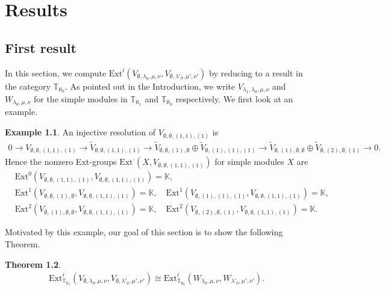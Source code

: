 \documentclass[openany, a4paper]{amsbook}
\newtheorem{thm}{Theorem}[chapter]
\theoremstyle{definition}
\newtheorem{exmp}[thm]{Example}
\numberwithin{equation}{chapter}
\newcommand{\T}[1]{{\mathbb{T}}_{\aleph_{#1}}}
\newcommand{\Ext}[4]{\mathrm{Ext}^{#1}_{#2}({#3}, {#4})}
\begin{document}
\chapter{Results}
\section{First result}

In this section, we compute $\Ext{i}{}{V_{\emptyset, \lambda_0, \mu, \nu}}{V_{\emptyset, \lambda'_0, \mu', \nu'}}$ by reducing to a result in the category $\T{0}$. As pointed out in the Introduction, we write $V_{\lambda_1, \lambda_0, \mu, \nu}$ and $W_{\lambda_0, \mu, \nu}$ for the simple modules in $\T{1}$ and $\T{0}$ respectively. We first look at an example.

\begin{exmp}
    An injective resolution of $V_{\emptyset, \emptyset, (1,1), (1)}$ is
    \begin{align*}
        0 \to V_{\emptyset, \emptyset, (1,1), (1)} \to \tilde{V}_{\emptyset, \emptyset, (1,1), (1)} \to \tilde{V}_{\emptyset, \emptyset, (1), \emptyset} \oplus\tilde{V}_{\emptyset, (1), (1), (1)} \to \tilde{V}_{\emptyset, (1),  \emptyset, \emptyset} \oplus\tilde{V}_{\emptyset, (2),  \emptyset, (1)} \to 0.
    \end{align*}
    Hence the nonzero Ext-groups $\Ext{\cdot}{}{X}{V_{\emptyset, \emptyset, (1,1), (1)}}$ for simple modules $X$ are
    \begin{align*}
        &\Ext{0}{}{V_{\emptyset, \emptyset, (1,1), (1)}}{V_{\emptyset, \emptyset, (1,1), (1)}} = \mathbb{K}, \\
        &\Ext{1}{}{V_{\emptyset, \emptyset, (1), \emptyset}}{V_{\emptyset, \emptyset, (1,1), (1)}} = \mathbb{K}, \quad  \Ext{1}{}{V_{\emptyset, (1), (1), (1)}}{V_{\emptyset, \emptyset, (1,1), (1)}} = \mathbb{K},\\
        &\Ext{2}{}{V_{\emptyset, (1),  \emptyset, \emptyset}}{V_{\emptyset, \emptyset, (1,1), (1)}} = \mathbb{K}, \quad \Ext{2}{}{V_{\emptyset, (2),  \emptyset, (1)}}{V_{\emptyset, \emptyset, (1,1), (1)}} = \mathbb{K}.
    \end{align*}
\end{exmp}

Motivated by this example, our goal of this section is to show the following Theorem. 
\begin{thm}\label{result1}
    \begin{align}
        \Ext{i}{\T{1}}{V_{\emptyset, \lambda_0, \mu, \nu}}{V_{\emptyset, \lambda'_0, \mu', \nu'}} \cong 
        \Ext{i}{\T{0}}{W_{\lambda_0, \mu, \nu}}{W_{\lambda'_0, \mu', \nu'}}.
        \end{align}        
\end{thm}
\end{document}

